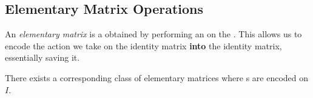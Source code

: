 \subsection{Elementary Matrix Operations}\label{subsec:Elementary_Matrix_Ops}
\begin{definition}\label{def:Elementary_Matrix}
  An \emph{elementary matrix} is a  obtained by performing an  on the .
  This allows us to encode the action we take on the identity matrix \textbf{into} the identity matrix, essentially saving it.

  \begin{remark}\label{rmk:Elementary_Column_Matrix}
    There exists a corresponding class of elementary matrices where s are encoded on $I$.
  \end{remark}
\end{definition}

